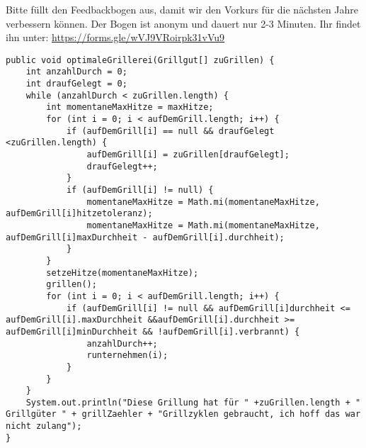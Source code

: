 \documentclass{../../sheet}
\begin{document}
Bitte füllt den Feedbackbogen aus, damit wir den Vorkurs für die nächsten Jahre verbessern können. Der Bogen ist anonym und dauert nur 2-3 Minuten. \newline Ihr findet ihn unter: \url{https://forms.gle/wVJ9VRoirpk31vVu9}
\newpage
{}
\hypertarget{Codeanhang1}{}
\begin{verbatim}
public void optimaleGrillerei(Grillgut[] zuGrillen) {
    int anzahlDurch = 0;
    int draufGelegt = 0;
    while (anzahlDurch < zuGrillen.length) {
        int momentaneMaxHitze = maxHitze;
        for (int i = 0; i < aufDemGrill.length; i++) {
            if (aufDemGrill[i] == null && draufGelegt <zuGrillen.length) {
                aufDemGrill[i] = zuGrillen[draufGelegt];
                draufGelegt++;
            }
            if (aufDemGrill[i] != null) {
                momentaneMaxHitze = Math.mi(momentaneMaxHitze, aufDemGrill[i]hitzetoleranz);
                momentaneMaxHitze = Math.mi(momentaneMaxHitze, aufDemGrill[i]maxDurchheit - aufDemGrill[i].durchheit);
            }
        }
        setzeHitze(momentaneMaxHitze);
        grillen();
        for (int i = 0; i < aufDemGrill.length; i++) {
            if (aufDemGrill[i] != null && aufDemGrill[i]durchheit <= aufDemGrill[i].maxDurchheit &&aufDemGrill[i].durchheit >= aufDemGrill[i]minDurchheit && !aufDemGrill[i].verbrannt) {
                anzahlDurch++;
                runternehmen(i);
            }
        }
    }
    System.out.println("Diese Grillung hat für " +zuGrillen.length + " Grillgüter " + grillZaehler + "Grillzyklen gebraucht, ich hoff das war nicht zulang");
}
\end{verbatim}
\end{document}
